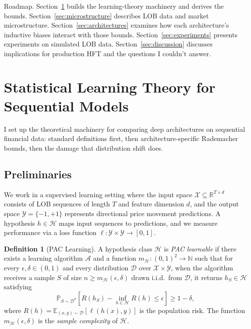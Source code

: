 \documentclass[11pt]{article}
\theoremstyle{definition}
\newtheorem{definition}[theorem]{Definition}
\theoremstyle{remark}
\newcommand{\R}{\mathbb{R}}
\newcommand{\E}{\mathbb{E}}
\newcommand{\Prob}{\mathbb{P}}
\newcommand{\cH}{\mathcal{H}}
\newcommand{\cD}{\mathcal{D}}
\newcommand{\cX}{\mathcal{X}}
\newcommand{\cY}{\mathcal{Y}}
\begin{document}
Roadmap.
Section~\ref{sec:theory} builds the learning-theory machinery and derives the bounds.
Section~\ref{sec:microstructure} describes LOB data and market microstructure.
Section~\ref{sec:architectures} examines how each architecture's inductive biases interact with those bounds.
Section~\ref{sec:experiments} presents experiments on simulated LOB data.
Section~\ref{sec:discussion} discusses implications for production HFT and the questions I couldn't answer.


\section{Statistical Learning Theory for Sequential Models}\label{sec:theory}

I set up the theoretical machinery for comparing deep architectures on sequential financial data: standard definitions first, then architecture-specific Rademacher bounds, then the damage that distribution shift does.

\subsection{Preliminaries}\label{sec:theory:prelim}

We work in a supervised learning setting where the input space $\cX \subseteq \R^{T \times d}$ consists of LOB sequences of length $T$ and feature dimension $d$, and the output space $\cY = \{-1, +1\}$ represents directional price movement predictions.
A hypothesis $h \in \cH$ maps input sequences to predictions, and we measure performance via a loss function $\ell: \cY \times \cY \to [0,1]$.

\begin{definition}[PAC Learning]\label{def:pac}
A hypothesis class $\cH$ is \emph{PAC learnable} if there exists a learning algorithm $\mathcal{A}$ and a function $m_\cH: (0,1)^2 \to \mathbb{N}$ such that for every $\epsilon, \delta \in (0,1)$ and every distribution $\cD$ over $\cX \times \cY$, when the algorithm receives a sample $S$ of size $n \geq m_\cH(\epsilon, \delta)$ drawn i.i.d.\ from $\cD$, it returns $h_S \in \cH$ satisfying
\[
    \Prob_{S \sim \cD^n}\!\left[ R(h_S) - \inf_{h \in \cH} R(h) \leq \epsilon \right] \geq 1 - \delta,
\]
where $R(h) = \E_{(x,y) \sim \cD}[\ell(h(x), y)]$ is the population risk.
The function $m_\cH(\epsilon, \delta)$ is the \emph{sample complexity} of $\cH$.
\end{definition}
\end{document}
